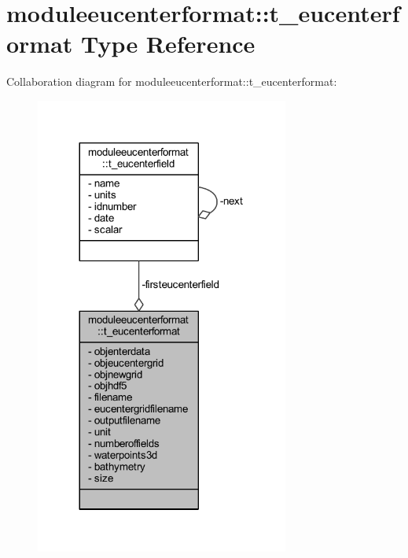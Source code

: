 \hypertarget{structmoduleeucenterformat_1_1t__eucenterformat}{}\section{moduleeucenterformat\+:\+:t\+\_\+eucenterformat Type Reference}
\label{structmoduleeucenterformat_1_1t__eucenterformat}


Collaboration diagram for moduleeucenterformat\+:\+:t\+\_\+eucenterformat\+:\nopagebreak
\begin{figure}[H]
\begin{center}
\leavevmode
\includegraphics[width=236pt]{structmoduleeucenterformat_1_1t__eucenterformat__coll__graph}
\end{center}
\end{figure}
